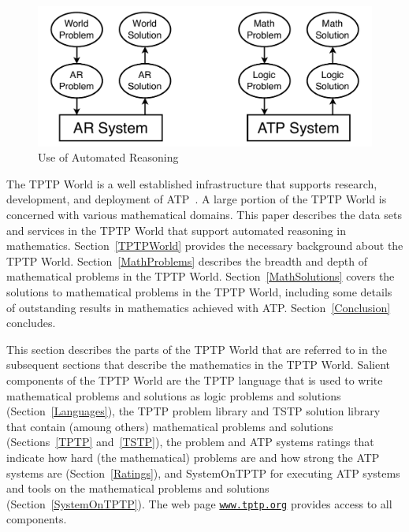 \documentclass[runningheads]{llncs}
\begin{document}
\begin{figure}[htb]
\centering
\includegraphics[width=1.0\textwidth]{UseOfAR.pdf}
\vspace*{-1em}
\caption{Use of Automated Reasoning}
\label{UseOfAR}
\end{figure}

The TPTP World is a well established infrastructure that supports research, development, and 
deployment of ATP~\cite{Sut10,Sut17}.
A large portion of the TPTP World is concerned with various mathematical domains.
This paper describes the data sets and services in the TPTP World that support automated reasoning
in mathematics.
Section~\ref{TPTPWorld} provides the necessary background about the TPTP World.
Section~\ref{MathProblems} describes the breadth and depth of mathematical problems in the TPTP
World.
Section~\ref{MathSolutions} covers the solutions to mathematical problems in the TPTP World,
including some details of outstanding results in mathematics achieved with ATP.
Section~\ref{Conclusion} concludes.

This section describes the parts of the TPTP World that are referred to in the subsequent sections 
that describe the mathematics in the TPTP World.
Salient components of the TPTP World are
the TPTP language that is used to write mathematical problems and solutions as logic problems and 
solutions (Section~\ref{Languages}),
the TPTP problem library and TSTP solution library that contain (amoung others) mathematical
problems and solutions (Sections~\ref{TPTP} and~\ref{TSTP}),
the problem and ATP systems ratings that indicate how hard (the mathematical) problems are and 
how strong the ATP systems are (Section~\ref{Ratings}),
and SystemOnTPTP for executing ATP systems and tools on the mathematical problems and solutions
(Section~\ref{SystemOnTPTP}).
The web page \href{http://www.tptp.org}{{\tt www.tptp.org}} provides access to all components.

\end{document}
